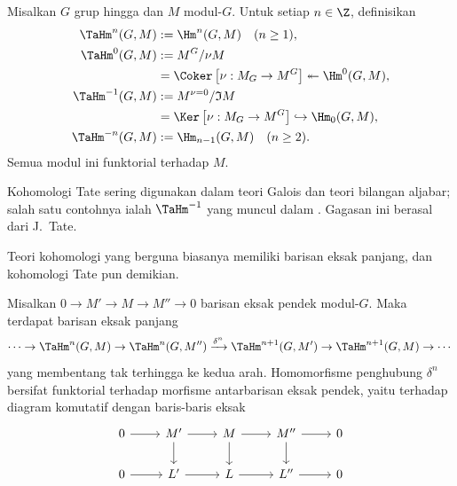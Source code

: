 \begin{definition}\label{def:TaHm}
	Misalkan $G$ grup hingga dan $M$ modul-$G$. Untuk setiap $n \in \Z$,
	definisikan
	\begin{align*}
		\TaHm^n(G, M) & := \Hm^n(G, M) \quad (n \geq 1), \\
		\TaHm^0(G, M) & := M^G / \nu M \\
		& = \Coker\left[ \nu: M_G \to M^G \right] \twoheadleftarrow \Hm^0(G, M), \\
		\TaHm^{-1}(G, M) & := M^{\nu=0} / \mathfrak{I} M \\
		& = \Ker\left[ \nu: M_G \to M^G \right] \hookrightarrow \Hm_0(G, M), \\
		\TaHm^{-n}(G, M) & := \Hm_{n-1}(G, M) \quad (n \geq 2).
	\end{align*}
	Semua modul ini funktorial terhadap $M$.
\end{definition}

Kohomologi Tate sering digunakan dalam teori Galois dan teori bilangan
aljabar; salah satu contohnya ialah $\TaHm^{-1}$ yang muncul dalam
\cite[Definisi 9.6.3]{Li1}. Gagasan ini berasal dari J.\ Tate.

Teori kohomologi yang berguna biasanya memiliki barisan eksak panjang, dan
kohomologi Tate pun demikian.

\begin{theorem}\label{prop:Tate-coh-long}
	Misalkan $0 \to M' \to M \to M'' \to 0$ barisan eksak pendek modul-$G$.
	Maka terdapat barisan eksak panjang
	\[ \cdots \to \TaHm^n(G, M) \to \TaHm^n(G, M'') \xrightarrow{\delta^n} \TaHm^{n+1}(G, M') \to \TaHm^{n+1}(G, M) \to \cdots \]
	yang membentang tak terhingga ke kedua arah. Homomorfisme penghubung
	$\delta^n$ bersifat funktorial terhadap morfisme antarbarisan eksak
	pendek, yaitu terhadap diagram komutatif dengan baris-baris eksak
	\[\begin{tikzcd}
		0 \arrow[r] & M' \arrow[d] \arrow[r] & M \arrow[d] \arrow[r] & M'' \arrow[d] \arrow[r] & 0 \\
		0 \arrow[r] & L' \arrow[r] & L \arrow[r] & L'' \arrow[r] & 0
	\end{tikzcd}\]
\end{theorem}

